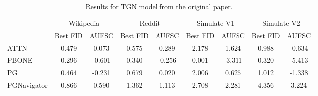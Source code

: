 \begin{table}
\centering
\caption{Results for TGN model from the original paper.}
\label{tab:tgn_results_og}
\begin{tabular}{lcccccccc}
\toprule
 & \multicolumn{2}{c}{Wikipedia} & \multicolumn{2}{c}{Reddit} & \multicolumn{2}{c}{Simulate V1} & \multicolumn{2}{c}{Simulate V2} \\
 & Best FID & AUFSC & Best FID & AUFSC & Best FID & AUFSC & Best FID & AUFSC \\
\midrule
ATTN & 0.479 & 0.073 & 0.575 & 0.289 & 2.178 & 1.624 & 0.988 & -0.634 \\
PBONE & 0.296 & -0.601 & 0.340 & -0.256 & 0.001 & -3.311 & 0.320 & -5.413 \\
PG & 0.464 & -0.231 & 0.679 & 0.020 & 2.006 & 0.626 & 1.012 & -1.338 \\
PGNavigator & 0.866 & 0.590 & 1.362 & 1.113 & 2.708 & 2.281 & 4.356 & 3.224 \\
\bottomrule
\end{tabular}
\end{table}
